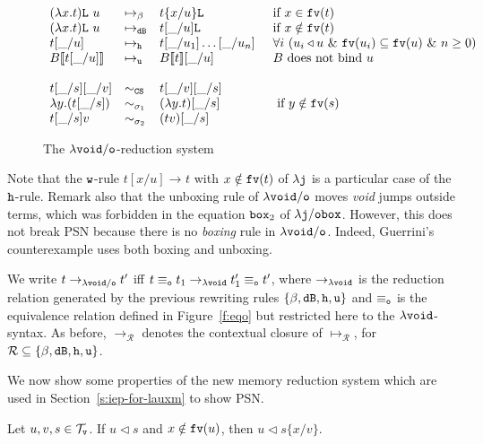 \documentclass{LMCS}
\renewcommand{\>}{\rightarrow}
\def\lam{\lambda}
\newcommand{\Rew}[1]{\rightarrow_{#1}}
\newcommand{\rRew}[1]{\mapsto_{#1}}
\newcommand{\isubs}[1]{ \{ #1  \} }
\newcommand{\B}{{\tt dB}}
\newcommand{\R}{\mathcal{R}}
\newcommand{\dis}{{\tt j}}
\newcommand{\ldis}{\lam{\dis}}
\newcommand{\fv}[1]{{\tt fv}(#1)}
\newcommand{\Gc}{{\tt w}}
\newcommand{\CS}{{\tt CS}}
\newcommand{\set}[1]{ \{ #1 \}}
\newcommand{\termsv}{\mathcal{T}_{\tt v}}
\newcommand{\unboxed}{{\tt u}}
\newcommand{\slist}{{\tt L}}
\newcommand{\modulo}[2]{#1/#2}
\newcommand{\eqo}{\equiv_\osym}
\newcommand{\preeq}{\sim}
\newcommand{\osym}{{\tt o}}
\newcommand{\preeqsigu}{\preeq_{\sigma_1}}
\newcommand{\preeqsigt}{\preeq_{\sigma_2}}
\newcommand{\ldisf}{\lam \modulo{\dis}{\fsymb}}
\newcommand{\fsymb}{\osymb\boite}
\newcommand{\osymb}{{\tt o}}
\newcommand{\aux}{{\tt void}}
\newcommand{\laux}{\lam\aux}
\newcommand{\lauxm}{\lam\modulo{ \aux }{ \osymb }}
\newcommand{\New}{{\tt h}}
\newcommand{\ctx}[2]{#1 [ \! [#2] \! ]}
\newcommand{\boite}{{\tt box}}
\newcommand{\sigq}{\boite_2}
\newcommand{\void}{\_}
\newcommand{\subt}{\triangleleft}
\begin{document}
\begin{figure}[ht]
\[ \begin{array}{lll@{\hspace{.5cm}}lll}
(\lam x.t) \slist\ u & \rRew{\beta} &  t\isubs{x/u}\slist & \mbox{if }  x \in \fv{t}\\
(\lam x.t) \slist\ u & \rRew{\B} &  t[\void/u]\slist & \mbox{if }  x \notin \fv{t}\\
t[\void/u] & \rRew{\New} & t[\void/u_{1}]\ldots [\void/u_n] & 
            \forall i\ (u_i \subt u\ \&\ \fv{u_i} \subseteq \fv{u}\ \&\ n \geq 0)\\
\ctx{B}{t[\void/u]} &  \rRew{\unboxed}   & \ctx{B}{t}[\void/u] & B \mbox{ does not bind } u\\\\
 t[\void/s][\void/v] & \sim_{\CS} & t[\void/v][\void/s] 
  \\
   \lam y. (t [\void/s]) & \preeqsigu & (\lam y. t) [\void/s]  & \mbox{ if } y\notin \fv{s} \\
   t[\void/s] v & \preeqsigt & (t v)[\void/s]  \\
\end{array}\] 
\caption{The $\lauxm$-reduction system\label{f:lauxm}}
\label{f:laux}
\end{figure}



 \noindent Note that the $\Gc$-rule $t[x/u] \Rew{} t$ with $x \notin \fv{t}$
 of $\ldis$ is a particular case of the $\New$-rule.  Remark
 also that the unboxing rule of $\lauxm$ moves \textit{void} jumps
 outside terms, which was forbidden in the equation
   $\sigq$ of $\ldisf$. However, this does not break PSN because 
 there is no \textit{boxing} rule in $\lauxm$. Indeed, Guerrini's counterexample
 uses both boxing and unboxing.

We write $t \Rew{\lauxm} t'$ iff $t \eqo t_1 \Rew{\laux} t'_1 \eqo t'$, where
$\Rew{\laux}$ is the reduction relation generated by the previous
rewriting rules $\set{\beta,\B,\New,\unboxed}$ and $\eqo$ is the 
equivalence relation defined in Figure~\ref{f:eqo}
but restricted here to the $\laux$-syntax. As before, $\Rew{\R}$ denotes the contextual closure
of $\rRew{\R}$, for  $\R \subseteq \set{\beta, \B,\New,\unboxed}$.

We now show some properties of the new memory reduction system which are 
used in Section~\ref{s:iep-for-lauxm} to show PSN.

 
\begin{lem}
\label{l:sous-terme-substitution}
Let $u,v,s \in \termsv$. If $u \subt s$ and $x \notin \fv{u}$, then
$u \subt s\isubs{x/v}$. 
\end{lem}
\end{document}
